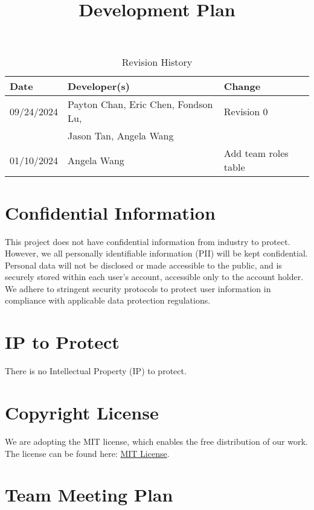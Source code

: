 \documentclass{article}
\title{Development Plan\\\progname}
\date{}
\begin{document}
\maketitle

\begin{table}[hp]
\caption{Revision History} \label{TblRevisionHistory}
\begin{tabularx}{\textwidth}{llX}
\toprule
\textbf{Date} & \textbf{Developer(s)} & \textbf{Change}\\
\midrule
09/24/2024 & Payton Chan, Eric Chen, Fondson Lu, & Revision 0\\
& Jason Tan, Angela Wang & \\
01/10/2024 & Angela Wang & Add team roles table\\
\bottomrule
\end{tabularx}
\end{table}

\newpage{}


\section{Confidential Information}
This project does not have confidential information from industry to protect.
However, we all personally identifiable information (PII) will be kept
confidential. Personal data will not be disclosed or made accessible to the
public, and is securely stored within each user's account, accessible only to
the account holder. We adhere to stringent security protocols to protect user
information in compliance with applicable data protection regulations.

\section{IP to Protect}
There is no Intellectual Property (IP) to protect.

\section{Copyright License}
We are adopting the MIT license, which enables the free distribution of our
work. The license can be found here:
\href{https://github.com/PlutosCapstone/Plutos/blob/main/LICENSE}{MIT License}.

\newpage

\section{Team Meeting Plan}
\end{document}
